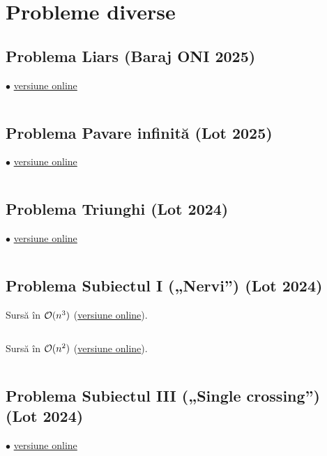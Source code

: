 \documentclass[../main.tex]{subfiles}
\begin{document}
\chapter{Probleme diverse}

\section{Problema Liars (Baraj ONI 2025)}
\label{code:liars}
$\bullet$
\href{https://kilonova.ro/submissions/774237}{versiune online}

\inputminted{cpp}{../src/assorted/liars.cpp}


\section{Problema Pavare infinită (Lot 2025)}
\label{code:pavare-infinită}
$\bullet$
\href{https://kilonova.ro/submissions/794552}{versiune online}

\inputminted{cpp}{../src/assorted/pavare-infinită.cpp}


\section{Problema Triunghi (Lot 2024)}
\label{code:triunghi}
$\bullet$
\href{https://kilonova.ro/submissions/1161780}{versiune online}

\inputminted{cpp}{../src/assorted/triunghi.cpp}


\section{Problema Subiectul I („Nervi”) (Lot 2024)}
\label{code:subiectul-i}

Sursă în $\mathcal{O}(n^3)$ (\href{https://kilonova.ro/submissions/1162798}{versiune online}).

\inputminted{cpp}{../src/assorted/subiectul-i-n3.cpp}

Sursă în $\mathcal{O}(n^2)$ (\href{https://kilonova.ro/submissions/1162799}{versiune online}).

\inputminted{cpp}{../src/assorted/subiectul-i-n2.cpp}


\section{Problema Subiectul III („Single crossing”) (Lot 2024)}
\label{code:subiectul-iii}
$\bullet$
\href{https://kilonova.ro/submissions/1162815}{versiune online}
\end{document}
